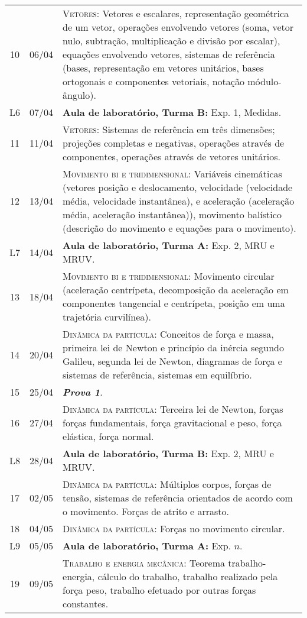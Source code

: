 \begin{center}
\begin{longtable}{ccp{70mm}}
10	 & 	06/04	 & 	\textsc{Vetores:} Vetores e escalares, representação geométrica de um vetor, operações envolvendo vetores (soma, vetor nulo, subtração, multiplicação e divisão por escalar), equações envolvendo vetores, sistemas de referência (bases, representação em vetores unitários, bases ortogonais e componentes vetoriais, notação módulo-ângulo). \\
L6   &  07/04    & \textbf{Aula de laboratório, Turma B:} Exp. 1, Medidas. \\
11	 & 	11/04	 & 	\textsc{Vetores:} Sistemas de referência em três dimensões; projeções completas e negativas, operações através de componentes, operações através de vetores unitários. \\
12	 & 	13/04	 & 	\textsc{Movimento bi e tridimensional:} Variáveis cinemáticas (vetores posição e deslocamento, velocidade (velocidade média, velocidade instantânea), e aceleração (aceleração média, aceleração instantânea)), movimento balístico (descrição do movimento e equações para o movimento). \\
L7   &  14/04    &  \textbf{Aula de laboratório, Turma A:} Exp. 2, MRU e MRUV.\\
13	 & 	18/04	 & 	\textsc{Movimento bi e tridimensional:} Movimento circular (aceleração centrípeta, decomposição da aceleração em componentes tangencial e centrípeta, posição em uma trajetória curvilínea). \\
14	 & 	20/04	 & 	\textsc{Dinâmica da partícula:} Conceitos de força e massa, primeira lei de Newton e princípio da inércia segundo Galileu, segunda lei de Newton, diagramas de força e sistemas de referência, sistemas em equilíbrio.\\
15	 & 	25/04	 & 	\textbf{\textit{Prova 1}}. \\
16	 & 	27/04	 & 	\textsc{Dinâmica da partícula:} Terceira lei de Newton, forças forças fundamentais, força gravitacional e peso, força elástica, força normal.\\
L8   &  28/04    &  \textbf{Aula de laboratório, Turma B:} Exp. 2, MRU e MRUV.\\
17	 & 	02/05	 & 	\textsc{Dinâmica da partícula:} Múltiplos corpos, forças de tensão, sistemas de referência orientados de acordo com o movimento. Forças de atrito e arrasto.\\
18	 & 	04/05	 & 	\textsc{Dinâmica da partícula:} Forças no movimento circular. \\
L9   &  05/05    &  \textbf{Aula de laboratório, Turma A:} Exp. $n$. \\
19	 & 	09/05	 & 	\textsc{Trabalho e energia mecânica:} Teorema trabalho-energia, cálculo do trabalho, trabalho realizado pela força peso, trabalho efetuado por outras forças constantes.\\

\end{longtable}
\end{center}
